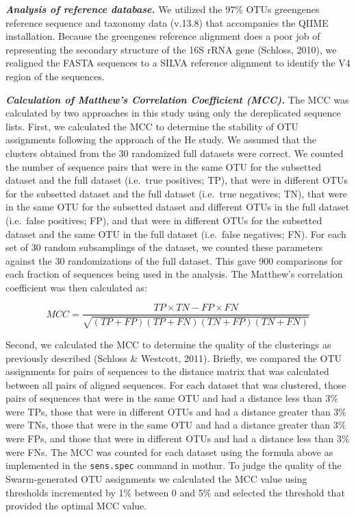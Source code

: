 \documentclass[11pt,]{article}
\begin{document}
\textbf{\emph{Analysis of reference database.}} We utilized the 97\%
OTUs greengenes reference sequence and taxonomy data (v.13.8) that
accompanies the QIIME installation. Because the greengenes reference
alignment does a poor job of representing the secondary structure of the
16S rRNA gene (Schloss, 2010), we realigned the FASTA sequences to a
SILVA reference alignment to identify the V4 region of the sequences.

\textbf{\emph{Calculation of Matthew's Correlation Coefficient (MCC).}}
The MCC was calculated by two approaches in this study using only the
dereplicated sequence lists. First, we calculated the MCC to determine
the stability of OTU assignments following the approach of the He study.
We assumed that the clusters obtained from the 30 randomized full
datasets were correct. We counted the number of sequence pairs that were
in the same OTU for the subsetted dataset and the full dataset
(i.e.~true positives; TP), that were in different OTUs for the subsetted
dataset and the full dataset (i.e.~true negatives; TN), that were in the
same OTU for the subsetted dataset and different OTUs in the full
dataset (i.e.~false positives; FP), and that were in different OTUs for
the subsetted dataset and the same OTU in the full dataset (i.e.~false
negatives; FN). For each set of 30 random subsamplings of the dataset,
we counted these parameters against the 30 randomizations of the full
dataset. This gave 900 comparisons for each fraction of sequences being
used in the analysis. The Matthew's correlation coefficient was then
calculated as:

\[
MCC = \frac{TP \times TN - FP \times FN}{\sqrt{(TP +FP)(TP+FN)(TN+FP)(TN+FN)} }
\]

Second, we calculated the MCC to determine the quality of the
clusterings as previously described (Schloss \& Westcott, 2011).
Briefly, we compared the OTU assignments for pairs of sequences to the
distance matrix that was calculated between all pairs of aligned
sequences. For each dataset that was clustered, those pairs of sequences
that were in the same OTU and had a distance less than 3\% were TPs,
those that were in different OTUs and had a distance greater than 3\%
were TNs, those that were in the same OTU and had a distance greater
than 3\% were FPs, and those that were in different OTUs and had a
distance less than 3\% were FNs. The MCC was counted for each dataset
using the formula above as implemented in the \texttt{sens.spec} command
in mothur. To judge the quality of the Swarm-generated OTU assignments
we calculated the MCC value using thresholds incremented by 1\% between
0 and 5\% and selected the threshold that provided the optimal MCC
value.
\end{document}

